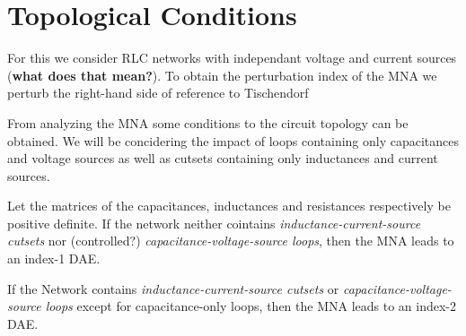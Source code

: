 \section{Topological Conditions}
For this we consider RLC networks with independant voltage and current sources (\textbf{what does that mean?}). To obtain the perturbation index of the MNA we perturb the right-hand side of  
\newline reference to Tischendorf

From analyzing the MNA some conditions to the circuit topology can be obtained. We will be concidering the impact of loops containing only capacitances and voltage sources as well as cutsets containing only inductances and current sources.

\begin{theorem} \cite{Tischendorf2004Topological}
	Let the matrices of the capacitances, inductances and resistances respectively be positive definite. If the network neither cointains \emph{inductance-current-source cutsets} nor (controlled?) \emph{capacitance-voltage-source loops}, then the MNA leads to an index-1 DAE.
\end{theorem}

\begin{theorem} \cite{Tischendorf2004Topological}
	If the Network contains \emph{inductance-current-source cutsets} or \emph{capacitance-voltage-source loops} except for capacitance-only loops, then the MNA leads to an index-2 DAE.
\end{theorem}